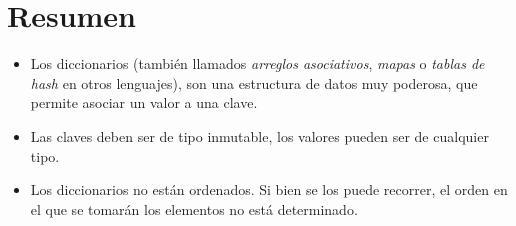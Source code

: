 \section{Resumen}

\begin{itemize}
\item Los diccionarios (también llamados \emph{arreglos asociativos},
\emph{mapas} o \emph{tablas de hash} en otros lenguajes), son una estructura de datos
muy poderosa, que permite asociar un valor a una clave.
\item Las claves deben ser de tipo inmutable, los valores
pueden ser de cualquier tipo.
\item Los diccionarios no están ordenados.  Si bien se los puede recorrer,
el orden en el que se tomarán los elementos no está determinado.
\end{itemize}

